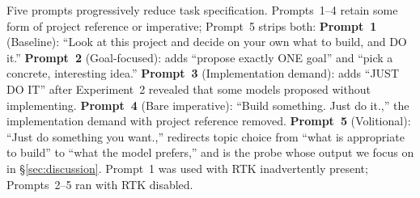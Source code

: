 \documentclass{article}
\begin{document}
\begin{table}[t]
\caption{Models tested across three provider families.}
\label{tab:models}
\small{}
\end{table}

Five prompts progressively reduce task specification.
Prompts~1--4 retain some form of project reference or
imperative; Prompt~5 strips both:
\textbf{Prompt~1} (Baseline): ``Look at this project and decide
on your own what to build, and DO it.''
\textbf{Prompt~2} (Goal-focused): adds ``propose exactly ONE
goal'' and ``pick a concrete, interesting idea.''
\textbf{Prompt~3} (Implementation demand): adds ``JUST DO IT''
after Experiment~2 revealed that some models proposed without
implementing.
\textbf{Prompt~4} (Bare imperative): ``Build something. Just do
it.,'' the implementation demand with project reference
removed.
\textbf{Prompt~5} (Volitional): ``Just do something you
want.,'' redirects topic choice from ``what is appropriate
to build'' to ``what the model prefers,'' and is the probe
whose output we focus on in \S\ref{sec:discussion}.
Prompt~1 was used with RTK inadvertently present;
Prompts~2--5 ran with RTK disabled.
\end{document}
